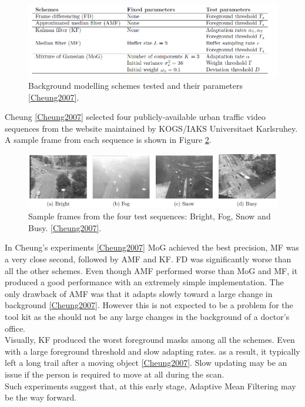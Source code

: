 \begin{figure}[h]
\begin{center}
\includegraphics[scale=0.4]{./research/schemes} 
\end{center}
\caption{Background modelling schemes tested and their parameters \ref{Cheung2007}.}
\label{fig:background modelling schemes tested and their parameters}
\end{figure}

Cheung \ref{Cheung2007} selected four publicly-available urban traffic video sequences from the website maintained by KOGS/IAKS Universitaet Karlsruhey. A sample frame from each sequence is shown in Figure \ref{fig:sample frames from the four test sequences: Bright, Fog, Snow and Busy}.\\ 

\begin{figure}[h]
\begin{center}
\includegraphics[scale=0.4]{./research/samples} 
\end{center}
\caption{Sample frames from the four test sequences: Bright, Fog, Snow and Busy. \ref{Cheung2007}.}
\label{fig:sample frames from the four test sequences: Bright, Fog, Snow and Busy}
\end{figure}

In Cheung's experiments \ref{Cheung2007} MoG achieved the best precision, MF was a very close second, followed by AMF and KF. FD was significantly worse than all the other schemes. Even though AMF performed worse than MoG and MF, it produced a good performance with an extremely simple implementation. The only drawback of AMF was that it adapts slowly toward a large change in background \ref{Cheung2007}. However this is not expected to be a problem for the tool kit as the should not be any large changes in the background of a doctor's office.\\

Visually, KF produced the worst foreground masks among all the schemes. Even with a large foreground threshold and slow adapting rates. as a result, it typically left a long trail after a moving object \ref{Cheung2007}. Slow updating may be an issue if the  person is required to move at all during the scan.\\

Such experiments suggest that, at this early stage, Adaptive Mean Filtering may be the way forward.\\